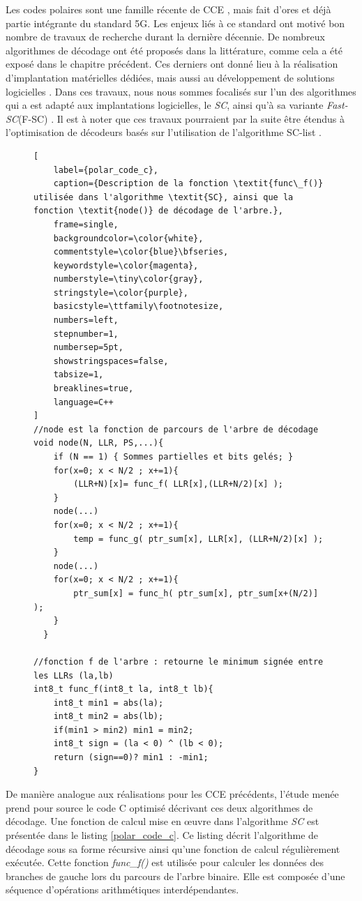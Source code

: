 \documentclass[../main.tex]{subfiles}
\begin{document}
Les codes polaires sont une famille récente de CCE \cite{Arikan_2009}, mais fait d'ores et déjà partie intégrante du standard 5G. Les enjeux liés à ce standard ont motivé bon nombre de travaux de recherche durant la dernière décennie. De nombreux algorithmes de décodage ont été proposés dans la littérature, comme cela a été exposé dans le chapitre précédent. Ces derniers ont donné lieu à la réalisation d'implantation matérielles dédiées, mais aussi au développement de solutions logicielles \cite{mcgill,Leonardon:2019vf}.
Dans ces travaux, nous nous sommes focalisés sur l'un des algorithmes qui a est adapté aux implantations logicielles, le \textit{SC}, ainsi qu'à sa variante \textit{Fast-SC}(F-SC) \cite{92}.
Il est à noter que ces travaux pourraient par la suite être étendus à l'optimisation de décodeurs basés sur l'utilisation de l'algorithme SC-list \cite{LEONARDON:SCL}.

\begin{figure}[tb]
\begin{lstlisting}[
    label={polar_code_c},
    caption={Description de la fonction \textit{func\_f()} utilisée dans l'algorithme \textit{SC}, ainsi que la fonction \textit{node()} de décodage de l'arbre.},
    frame=single,
    backgroundcolor=\color{white},  
    commentstyle=\color{blue}\bfseries,
    keywordstyle=\color{magenta},
    numberstyle=\tiny\color{gray},
    stringstyle=\color{purple},
    basicstyle=\ttfamily\footnotesize,
    numbers=left,
    stepnumber=1,
    numbersep=5pt,                 
    showstringspaces=false,
    tabsize=1,
    breaklines=true,
    language=C++
]
//node est la fonction de parcours de l'arbre de décodage 
void node(N, LLR, PS,...){
    if (N == 1) { Sommes partielles et bits gelés; }
    for(x=0; x < N/2 ; x+=1){
        (LLR+N)[x]= func_f( LLR[x],(LLR+N/2)[x] );
    }
    node(...)
    for(x=0; x < N/2 ; x+=1){
        temp = func_g( ptr_sum[x], LLR[x], (LLR+N/2)[x] );
    }
    node(...)
    for(x=0; x < N/2 ; x+=1){
        ptr_sum[x] = func_h( ptr_sum[x], ptr_sum[x+(N/2)] );
    }
  }

//fonction f de l'arbre : retourne le minimum signée entre les LLRs (la,lb)
int8_t func_f(int8_t la, int8_t lb){
    int8_t min1 = abs(la);
    int8_t min2 = abs(lb);
    if(min1 > min2) min1 = min2;
    int8_t sign = (la < 0) ^ (lb < 0);
    return (sign==0)? min1 : -min1;
}
\end{lstlisting}
\end{figure}
De manière analogue aux réalisations pour les CCE précédents, l'étude menée prend pour source le code C optimisé décrivant ces deux algorithmes de décodage. Une fonction de calcul mise en œuvre dans l'algorithme \textit{SC} est présentée dans le listing \ref{polar_code_c}. Ce listing décrit l'algorithme de décodage sous sa forme récursive ainsi qu'une fonction de calcul régulièrement exécutée. Cette fonction \textit{func\_f()} est utilisée pour calculer les données des branches de gauche lors du parcours de l'arbre binaire. Elle est composée d'une séquence d'opérations arithmétiques interdépendantes.
\end{document}
